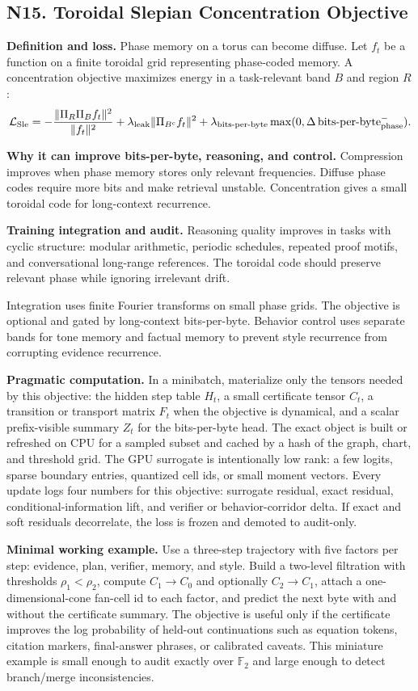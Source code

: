 \documentclass[10pt]{article}
\newcommand{\FF}{\mathbb{F}}
\newcommand{\bitsperbyte}{\operatorname{bits\text{-}per\text{-}byte}}
\newcommand{\loss}{\mathcal{L}}
\numberwithin{equation}{section}
\begin{document}
\subsection{N15. Toroidal Slepian Concentration Objective}
\noindent\textbf{Definition and loss.} Phase memory on a torus can become diffuse. Let $f_t$ be a function on a finite toroidal grid representing phase-coded memory. A concentration objective maximizes energy in a task-relevant band $B$ and region $R$:
\[
\loss_{\rm Sle}= -\frac{\|\Pi_R\Pi_B f_t\|^2}{\|f_t\|^2}+\lambda_{\rm leak}\|\Pi_{B^c}f_t\|^2+\lambda_{\rm bits\text{-}per\text{-}byte}\max(0,\Delta\bitsperbyte_{\rm phase}^{-}).
\]

\noindent\textbf{Why it can improve bits-per-byte, reasoning, and control.} Compression improves when phase memory stores only relevant frequencies. Diffuse phase codes require more bits and make retrieval unstable. Concentration gives a small toroidal code for long-context recurrence.

\noindent\textbf{Training integration and audit.} Reasoning quality improves in tasks with cyclic structure: modular arithmetic, periodic schedules, repeated proof motifs, and conversational long-range references. The toroidal code should preserve relevant phase while ignoring irrelevant drift.

Integration uses finite Fourier transforms on small phase grids. The objective is optional and gated by long-context bits-per-byte. Behavior control uses separate bands for tone memory and factual memory to prevent style recurrence from corrupting evidence recurrence.

\noindent\textbf{Pragmatic computation.} In a minibatch, materialize only the tensors needed by this objective: the hidden step table $H_t$, a small certificate tensor $C_t$, a transition or transport matrix $F_t$ when the objective is dynamical, and a scalar prefix-visible summary $Z_t$ for the bits-per-byte head. The exact object is built or refreshed on CPU for a sampled subset and cached by a hash of the graph, chart, and threshold grid. The GPU surrogate is intentionally low rank: a few logits, sparse boundary entries, quantized cell ids, or small moment vectors. Every update logs four numbers for this objective: surrogate residual, exact residual, conditional-information lift, and verifier or behavior-corridor delta. If exact and soft residuals decorrelate, the loss is frozen and demoted to audit-only.

\noindent\textbf{Minimal working example.} Use a three-step trajectory with five factors per step: evidence, plan, verifier, memory, and style. Build a two-level filtration with thresholds $\rho_1<\rho_2$, compute $C_1\to C_0$ and optionally $C_2\to C_1$, attach a one-dimensional-cone fan-cell id to each factor, and predict the next byte with and without the certificate summary. The objective is useful only if the certificate improves the log probability of held-out continuations such as equation tokens, citation markers, final-answer phrases, or calibrated caveats. This miniature example is small enough to audit exactly over $\FF_2$ and large enough to detect branch/merge inconsistencies.
\end{document}
